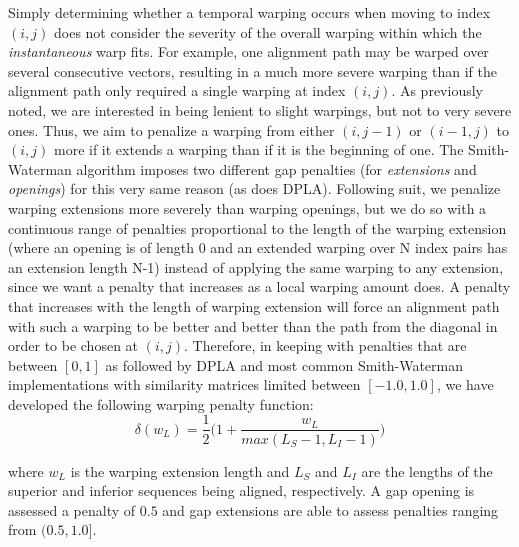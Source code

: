\documentclass[12pt]{report} 	%
\numberwithin{figure}{chapter}
\numberwithin{table}{chapter}
\numberwithin{equation}{chapter}
\begin{document}
\begin{flushleft}
Simply determining whether a temporal warping occurs when moving to index $(i,j)$ does not consider the severity of the overall warping within which the \textit{instantaneous} warp fits. For example, one alignment path may be warped over several consecutive vectors, resulting in a much more severe warping than if the alignment path only required a single warping at index $(i,j)$. As previously noted, we are interested in being lenient to slight warpings, but not to very severe ones. Thus, we aim to penalize a warping from either $(i,j-1)$ or $(i-1,j)$ to $(i,j)$ more if it extends a warping than if it is the beginning of one. The Smith-Waterman algorithm imposes two different gap penalties (for \textit{extensions} and \textit{openings}) for this very same reason (as does DPLA). Following suit, we penalize warping extensions more severely than warping openings, but we do so with a continuous range of penalties proportional to the length of the warping extension (where an opening is of length 0 and an extended warping over N index pairs has an extension length N-1) instead of applying the same warping to any extension, since we want a penalty that increases as a local warping amount does. A penalty that increases with the length of warping extension will force an alignment path with such a warping to be better and better than the path from the diagonal in order to be chosen at $(i,j)$. Therefore, in keeping with penalties that are between $[0,1]$ as followed by DPLA and most common Smith-Waterman implementations with similarity matrices limited between $[-1.0,1.0]$, we have developed the following warping penalty function:
\begin{equation}
\delta(w_L) = \frac{1}{2}\bigg(1 + \frac{w_L}{max(L_S - 1,L_I - 1)}\bigg)
\end{equation}

\vspace{10 mm}
\noindent where $w_L$ is the warping extension length and $L_S$ and $L_I$ are the lengths of the superior and inferior sequences being aligned, respectively. A gap opening is assessed a penalty of $0.5$ and gap extensions are able to assess penalties ranging from $(0.5,1.0]$.


\end{flushleft}
\end{document}
